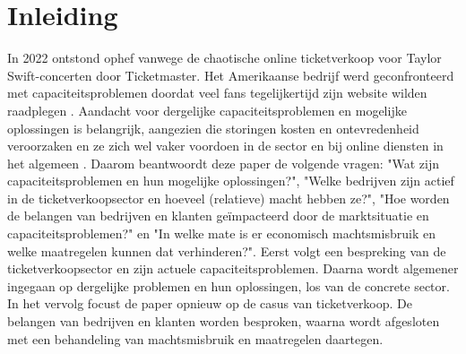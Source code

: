 
\section{Inleiding}

In 2022 ontstond ophef vanwege de chaotische online ticketverkoop voor 
Taylor Swift-concerten door Ticketmaster. Het Amerikaanse bedrijf werd
geconfronteerd met capaciteitsproblemen doordat veel fans tegelijkertijd
zijn website wilden raadplegen \cite{kelley2022senate,belga2022taylor}.
Aandacht voor dergelijke capaciteitsproblemen en mogelijke oplossingen
is belangrijk, aangezien die storingen kosten en ontevredenheid veroorzaken en
ze zich wel vaker voordoen in de sector \cite{sisario2023ticketmaster,
timsit2023its} en bij online diensten in het algemeen \cite{warren2023chatgpt, 
warren2020discord, reuters2023what}.
Daarom beantwoordt deze paper de volgende vragen:
"Wat zijn capaciteitsproblemen en hun mogelijke oplossingen?",
"Welke bedrijven zijn actief in de ticketverkoopsector en hoeveel (relatieve)
macht hebben ze?",
"Hoe worden de belangen van bedrijven en klanten
geïmpacteerd door de marktsituatie en capaciteitsproblemen?" en
"In welke mate is er economisch machtsmisbruik en welke maatregelen kunnen
dat verhinderen?".
Eerst volgt een bespreking van de ticketverkoopsector en
zijn actuele capaciteitsproblemen.
Daarna wordt algemener ingegaan op dergelijke problemen en hun oplossingen,
los van de concrete sector.
In het vervolg focust de paper opnieuw op de casus van ticketverkoop.
De belangen van bedrijven en klanten worden besproken,
waarna wordt afgesloten met een behandeling van machtsmisbruik en
maatregelen daartegen.